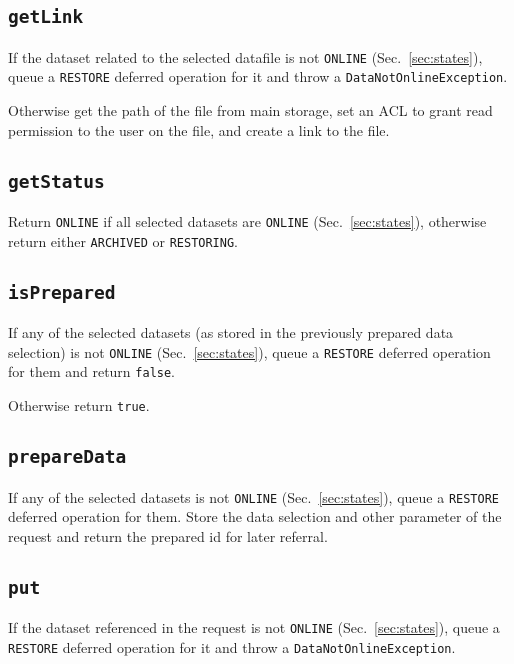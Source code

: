 \documentclass[paper=a4]{scrartcl}
\begin{document}
\subsection{\texttt{getLink}}

If the dataset related to the selected datafile is not \texttt{ONLINE}
(Sec.\ \ref{sec:states}), queue a \texttt{RESTORE} deferred operation
for it and throw a \texttt{DataNotOnlineException}.

Otherwise get the path of the file from main storage, set an ACL to
grant read permission to the user on the file, and create a link to
the file.

\subsection{\texttt{getStatus}}

Return \texttt{ONLINE} if all selected datasets are \texttt{ONLINE}
(Sec.\ \ref{sec:states}), otherwise return either \texttt{ARCHIVED} or
\texttt{RESTORING}.

\subsection{\texttt{isPrepared}}

If any of the selected datasets (as stored in the previously prepared
data selection) is not \texttt{ONLINE} (Sec.\ \ref{sec:states}), queue
a \texttt{RESTORE} deferred operation for them and return
\texttt{false}.

Otherwise return \texttt{true}.

\subsection{\texttt{prepareData}}

If any of the selected datasets is not \texttt{ONLINE}
(Sec.\ \ref{sec:states}), queue a \texttt{RESTORE} deferred operation
for them.  Store the data selection and other parameter of the request
and return the prepared id for later referral.

\subsection{\texttt{put}}

If the dataset referenced in the request is not \texttt{ONLINE}
(Sec.\ \ref{sec:states}), queue a \texttt{RESTORE} deferred operation
for it and throw a \texttt{DataNotOnlineException}.
\end{document}
